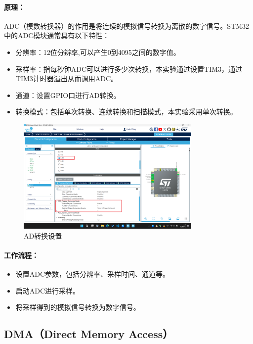 \documentclass{article}
\begin{document}
\paragraph{原理：}
ADC（模数转换器）的作用是将连续的模拟信号转换为离散的数字信号。STM32中的ADC模块通常具有以下特性：
\begin{itemize}
    \item 分辨率：12位分辨率,可以产生0到4095之间的数字值。
    \item 采样率：指每秒钟ADC可以进行多少次转换，本实验通过设置TIM3，通过TIM3计时器溢出从而调用ADC。
    \item 通道：设置GPIO口进行AD转换。
    \item 转换模式：包括单次转换、连续转换和扫描模式，本实验采用单次转换。
\end{itemize}
\begin{figure}[H]
    \centering
    \includegraphics[width=0.8\textwidth]{assets/3.png}
    \caption{AD转换设置}
\end{figure}
\paragraph{工作流程：}
\begin{itemize}
    \item 设置ADC参数，包括分辨率、采样时间、通道等。
    \item 启动ADC进行采样。
    \item 将采样得到的模拟信号转换为数字信号。
\end{itemize}
\subsection{DMA（Direct Memory Access）}
\end{document}
